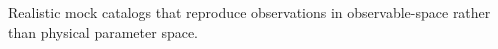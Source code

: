 Realistic mock catalogs that reproduce observations in observable-space rather
than physical parameter space.  

